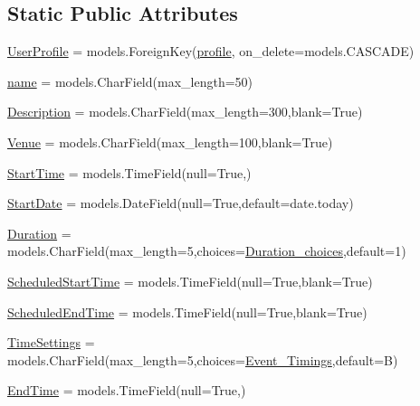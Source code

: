 \subsection*{Static Public Attributes}
\begin{DoxyCompactItemize}
\item 
\hyperlink{classTimetable_1_1models_1_1Event_a9a15a1f3ee137c8722f92920b00229bc}{User\+Profile} = models.\+Foreign\+Key(\hyperlink{classprofiles_1_1models_1_1profile}{profile}, on\+\_\+delete=models.\+C\+A\+S\+C\+A\+DE)
\item 
\hyperlink{classTimetable_1_1models_1_1Event_a774e00d377c679749ab116b28816529b}{name} = models.\+Char\+Field(max\+\_\+length=50)
\item 
\hyperlink{classTimetable_1_1models_1_1Event_aea7440b3b473e3240dcdce84a270e8c3}{Description} = models.\+Char\+Field(max\+\_\+length=300,blank=True)
\item 
\hyperlink{classTimetable_1_1models_1_1Event_a65d9ca29ba1e1b6675db649211e3f3aa}{Venue} = models.\+Char\+Field(max\+\_\+length=100,blank=True)
\item 
\hyperlink{classTimetable_1_1models_1_1Event_ad4685e5d780c691518156ec2d6984ce9}{Start\+Time} = models.\+Time\+Field(null=True,)
\item 
\hyperlink{classTimetable_1_1models_1_1Event_adfecfcec3bf86bc596b0ae87f8dad74d}{Start\+Date} = models.\+Date\+Field(null=True,default=date.\+today)
\item 
\hyperlink{classTimetable_1_1models_1_1Event_aa56da6b4d9364d76dddd725d13851f60}{Duration} = models.\+Char\+Field(max\+\_\+length=5,choices=\hyperlink{namespaceTimetable_1_1models_a3de5e5d97c7dbbfd08e212b9d1ad3ec5}{Duration\+\_\+choices},default=\textquotesingle{}1\textquotesingle{})
\item 
\hyperlink{classTimetable_1_1models_1_1Event_a8474acb2f5ed92f0eb0bb53396faa095}{Scheduled\+Start\+Time} = models.\+Time\+Field(null=True,blank=True)
\item 
\hyperlink{classTimetable_1_1models_1_1Event_a9db70fd3edf6430e290f7a1da2f79a3d}{Scheduled\+End\+Time} = models.\+Time\+Field(null=True,blank=True)
\item 
\hyperlink{classTimetable_1_1models_1_1Event_a5efd9cdcfa42baa6c93dce2c286c52b4}{Time\+Settings} = models.\+Char\+Field(max\+\_\+length=5,choices=\hyperlink{namespaceTimetable_1_1models_aed6c941f263e653fcb4c0da06577c61b}{Event\+\_\+\+Timings},default=\textquotesingle{}B\textquotesingle{})
\item 
\hyperlink{classTimetable_1_1models_1_1Event_a4a59dcfcca0b556a92db338024483372}{End\+Time} = models.\+Time\+Field(null=True,)

\end{DoxyCompactItemize}
